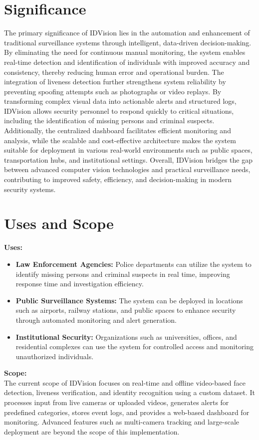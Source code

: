 \documentclass[11pt]{report}
\begin{document}
\section{Significance}
The primary significance of IDVision lies in the automation and enhancement of traditional surveillance systems through intelligent, data-driven decision-making. By eliminating the need for continuous manual monitoring, the system enables real-time detection and identification of individuals with improved accuracy and consistency, thereby reducing human error and operational burden. The integration of liveness detection further strengthens system reliability by preventing spoofing attempts such as photographs or video replays. By transforming complex visual data into actionable alerts and structured logs, 
IDVision allows security personnel to respond quickly to critical situations, including the identification of missing persons and criminal suspects. Additionally, the centralized dashboard facilitates efficient monitoring and analysis, while the scalable and cost-effective architecture makes the system suitable for deployment in various real-world environments such as public spaces, transportation hubs, and institutional settings. Overall, IDVision bridges the gap between advanced computer vision technologies and practical surveillance needs, contributing to improved safety, efficiency, and decision-making in modern security systems.

\section{Uses and Scope}
\textbf{Uses:}
\begin{itemize}
    \item \textbf{Law Enforcement Agencies:} Police departments can utilize the system to identify missing persons and criminal suspects in real time, improving response time and investigation efficiency.
    \item \textbf{Public Surveillance Systems:} The system can be deployed in locations such as airports, railway stations, and public spaces to enhance security through automated monitoring and alert generation.
    \item \textbf{Institutional Security:} Organizations such as universities, offices, and residential complexes can use the system for controlled access and monitoring unauthorized individuals.
\end{itemize}
\textbf{Scope:} \\
The current scope of IDVision focuses on real-time and offline video-based face detection, liveness verification, and identity recognition using a custom dataset. It processes input from live cameras or uploaded videos, generates alerts for predefined categories, stores event logs, and provides a web-based dashboard for monitoring. Advanced features such as multi-camera tracking and large-scale deployment are beyond the scope of this implementation.
\end{document}
